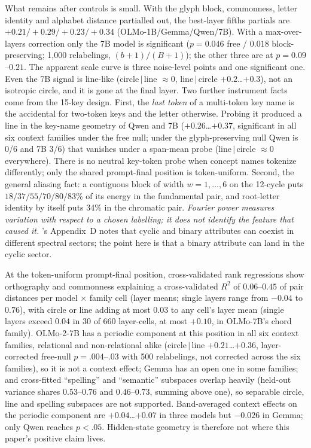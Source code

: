 \documentclass[11pt]{article}
\newcommand{\lc}{line$\,|\,$circle}
\newcommand{\cl}{circle$\,|\,$line}
\begin{document}
What remains after controls is small. With the glyph block, commonness, letter identity and alphabet distance partialled out, the best-layer fifths partials are $+0.21/{+}0.29/{+}0.23/{+}0.34$ (OLMo-1B/Gemma/Qwen/7B). With a max-over-layers correction only the 7B model is significant ($p=0.046$ free / $0.018$ block-preserving; 1,000 relabelings, $(b+1)/(B+1)$); the other three are at $p=0.09$--$0.21$. The apparent scale curve is three noise-level points and one significant one. Even the 7B signal is line-like (\cl{} $\approx0$, \lc{} $+0.2$…$+0.3$), not an isotropic circle, and it is gone at the final layer. Two further instrument facts come from the 15-key design. First, the \emph{last token} of a multi-token key name is the accidental for two-token keys and the letter otherwise. Probing it produced a line in the key-name geometry of Qwen and 7B ($+0.26$…$+0.37$, significant in all six context families under the free null; under the glyph-preserving null Qwen is 0/6 and 7B 3/6) that vanishes under a span-mean probe (\lc{} $\approx0$ everywhere). There is no neutral key-token probe when concept names tokenize differently; only the shared prompt-final position is token-uniform. Second, the general aliasing fact: a contiguous block of width $w=1,\dots,6$ on the 12-cycle puts $18/37/55/70/80/83\%$ of its energy in the fundamental pair, and root-letter identity by itself puts 34\% in the chromatic pair. \emph{Fourier power measures variation with respect to a chosen labelling; it does not identify the feature that caused it.} \citet{karkada2026symmetry}'s Appendix~D notes that cyclic and binary attributes can coexist in different spectral sectors; the point here is that a binary attribute can land in the cyclic sector.

At the token-uniform prompt-final position, cross-validated rank regressions show orthography and commonness explaining a cross-validated $R^2$ of $0.06$--$0.45$ of pair distances per model $\times$ family cell (layer means; single layers range from $-0.04$ to $0.76$), with circle or line adding at most $0.03$ to any cell's layer mean (single layers exceed $0.04$ in 30 of 660 layer-cells, at most $+0.10$, in OLMo-7B's chord family). OLMo-2-7B has a periodic component at this position in all six context families, relational and non-relational alike (\cl{} $+0.21$…$+0.36$, layer-corrected free-null $p=.004$--$.03$ with 500 relabelings, not corrected across the six families), so it is not a context effect; Gemma has an open one in some families; and cross-fitted ``spelling'' and ``semantic'' subspaces overlap heavily (held-out variance shares $0.53$--$0.76$ and $0.46$--$0.73$, summing above one), so separable circle, line and spelling subspaces are not supported. Band-averaged context effects on the periodic component are $+0.04$…$+0.07$ in three models but $-0.026$ in Gemma; only Qwen reaches $p<.05$. Hidden-state geometry is therefore not where this paper's positive claim lives.
\end{document}

